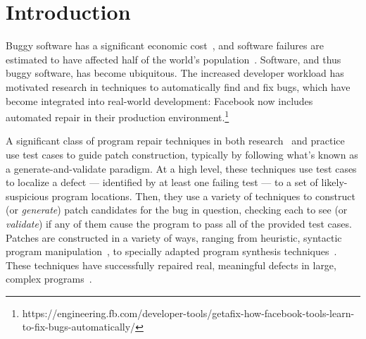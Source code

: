 \documentclass[sigconf, timestamp-false, anonymous=true]{acmart}
\begin{document}
\maketitle


\newcommand{\rqorinsight}[2]{
  \setlength{\fboxsep}{0.8em}
  \vspace{0.5em}
  \begin{center}
  \Ovalbox{\begin{minipage}{0.9\linewidth}
    \textbf{RQ#1:} #2
    \end{minipage}}
  \end{center}
  \vspace{0.5em}}

\section{Introduction}

Buggy software has a significant economic cost~\cite{cambridge-study}, and
software failures are estimated to have affected half of the world's
population~\cite{tricentis}. Software, and thus buggy software, has become
ubiquitous. The increased developer workload has motivated research in
techniques to automatically find and fix bugs, which have become integrated into
real-world development: Facebook now includes automated repair in their
production
environment.\footnote{https://engineering.fb.com/developer-tools/getafix-how-facebook-tools-learn-to-fix-bugs-automatically/}

A significant class of program repair techniques in both
research~\cite{genprog,angelix,Le17, Xuan17} and practice~\cite{sapfix} use test
cases to guide patch construction, typically by following what's known as a
generate-and-validate paradigm. At a high level, these techniques use test cases
to localize a defect --- identified by at least one failing test --- to a set of
likely-suspicious program locations. Then, they use a variety of techniques to
construct (or \emph{generate}) patch candidates for the bug in question,
checking each to see (or \emph{validate}) if any of them cause the program to
pass all of the provided test cases.
%
Patches are constructed in a variety of ways, ranging from heuristic, syntactic
program manipulation~\cite{par,genprog,rsrepair,ae,prophet,hdrepair}, to specially adapted program
synthesis techniques~\cite{Konighofer11,Konighofer12,semfix,DeMarco14,angelix}. These techniques have successfully
repaired real, meaningful defects in large, complex
programs~\cite{angelix,genprog-eight-dollars,prophet,sapfix}.
\end{document}
